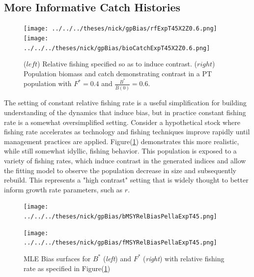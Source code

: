 \documentclass[12pt]{article}
\begin{document}
%
\clearpage
\subsection{More Informative Catch Histories}

%
\begin{figure}[h!]
\texttt{[image: ../../../theses/nick/gpBias/rfExpT45X2Z0.6.png]}
\texttt{[image: ../../../theses/nick/gpBias/bioCatchExpT45X2Z0.6.png]}
\caption{ \label{expCatchT45}
($left$) Relative fishing specified so as to induce contrast.
($right$) Population biomass and catch demonstrating contrast in a PT population with $F^*=0.4$ and $\frac{B^*}{\bar B(0)}=0.6$.
}
\end{figure}

%
The setting of constant relative fishing rate is a useful simplification for 
building understanding of the dynamics that induce bias, but in practice constant 
fishing rate is a somewhat oversimplified setting. %
Consider a hypothetical stock where fishing rate accelerates as technology 
and fishing techniques improve rapidly until management practices are applied. %
Figure(\ref{expCatchT45}) demonstrates this more realistic, while still somewhat idyllic, %
fishing behavior. This population is exposed to a variety of fishing rates, 
which induce contrast in the generated indices and allow the fitting model to 
observe the population decrease in size and subsequently rebuild. This represents 
a "high contrast" setting that is widely thought to better inform growth rate 
parameters, such as $r$.  

\begin{figure}[h!]
\vspace{-1cm}
\begin{minipage}[h!]{0.49\textwidth}
\texttt{[image: ../../../theses/nick/gpBias/bMSYRelBiasPellaExpT45.png]}
\end{minipage}
\begin{minipage}[h!]{0.49\textwidth}
\texttt{[image: ../../../theses/nick/gpBias/fMSYRelBiasPellaExpT45.png]}
\end{minipage}
\caption{ \label{expT45BmFm} 
MLE Bias surfaces for $B^*$ (\emph{left}) and $F^*$ (\emph{right}) with relative fishing rate as specified in Figure({\ref{expCatchT45}})
}
\end{figure}
\end{document}

